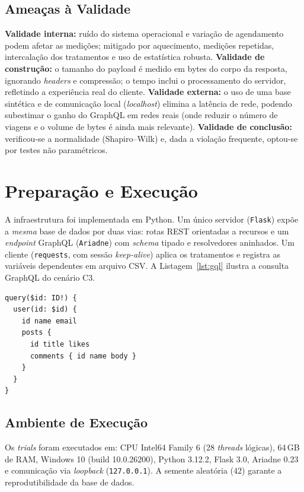 \documentclass[conference]{IEEEtran}
\begin{document}
\subsection{Ameaças à Validade}
\textbf{Validade interna:} ruído do sistema operacional e variação de
agendamento podem afetar as medições; mitigado por aquecimento, medições
repetidas, intercalação dos tratamentos e uso de estatística robusta.
\textbf{Validade de construção:} o tamanho do payload é medido em bytes do
corpo da resposta, ignorando \textit{headers} e compressão; o tempo inclui o
processamento do servidor, refletindo a experiência real do cliente.
\textbf{Validade externa:} o uso de uma base sintética e de comunicação local
(\textit{localhost}) elimina a latência de rede, podendo subestimar o ganho do
GraphQL em redes reais (onde reduzir o número de viagens e o volume de bytes é
ainda mais relevante). \textbf{Validade de conclusão:} verificou-se a
normalidade (Shapiro--Wilk) e, dada a violação frequente, optou-se por testes
não paramétricos.

\section{Preparação e Execução}
A infraestrutura foi implementada em Python. Um único servidor
(\texttt{Flask}) expõe a \emph{mesma} base de dados por duas vias: rotas REST
orientadas a recursos e um \textit{endpoint} GraphQL (\texttt{Ariadne}) com
\textit{schema} tipado e resolvedores aninhados. Um cliente
(\texttt{requests}, com sessão \textit{keep-alive}) aplica os tratamentos e
registra as variáveis dependentes em arquivo CSV. A
Listagem~\ref{lst:gql} ilustra a consulta GraphQL do cenário C3.

\begin{lstlisting}[caption={Consulta GraphQL do cenário aninhado C3.},label={lst:gql}]
query($id: ID!) {
  user(id: $id) {
    id name email
    posts {
      id title likes
      comments { id name body }
    }
  }
}
\end{lstlisting}

\subsection{Ambiente de Execução}
Os \textit{trials} foram executados em: CPU Intel64 Family 6 (28
\textit{threads} lógicas), 64\,GB de RAM, Windows 10 (build 10.0.26200),
Python 3.12.2, Flask 3.0, Ariadne 0.23 e comunicação via
\textit{loopback} (\texttt{127.0.0.1}). A semente aleatória ($42$) garante a
reprodutibilidade da base de dados.
\end{document}
